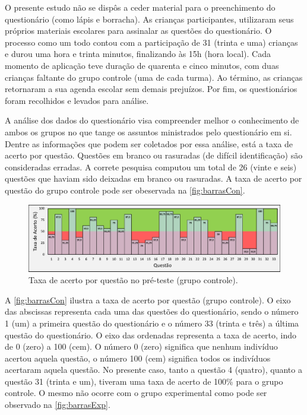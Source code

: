 O presente estudo não se dispôs a ceder material para o preenchimento do questionário (como lápis e borracha). As crianças participantes, utilizaram seus próprios materiais escolares para assinalar as questões do questionário. O processo como um todo contou com a participação de 31 (trinta e uma)  crianças e durou uma hora e trinta minutos, finalizando às 15h (hora local). Cada momento de aplicação teve duração de quarenta e cinco minutos, com duas crianças faltante do grupo controle (uma de cada turma). Ao término, as crianças retornaram a sua agenda escolar sem demais prejuízos. Por fim, os questionários foram recolhidos e levados para análise.

A análise dos dados do questionário visa compreender melhor o conhecimento de ambos os grupos no que tange os assuntos ministrados pelo questionário em si. Dentre as informações que podem ser coletados por essa análise, está a taxa de acerto por questão. Questões em branco ou rasuradas (de difícil identificação) são consideradas erradas. A correte pesquisa computou um total de 26 (vinte e seis) questões que haviam sido deixadas em branco ou rasuradas. A taxa de acerto por questão do grupo controle pode ser obeservada na \autoref{fig:barrasCon}.

\begin{figure}[htb]

    \caption{\label{fig:barrasCon}Taxa de acerto por questão no pré-teste (grupo controle).}
    \includegraphics[width=\linewidth]{./Visuais/Notas4.pdf}
  
\end{figure}

A \autoref{fig:barrasCon} ilustra a taxa de acerto por questão (grupo controle). O eixo das abscissas representa cada uma das questões do questionário, sendo o número 1 (um) a primeira questão do questionário e o número 33 (trinta e três) a última questão do questionário. O eixo das ordenadas representa a taxa de acerto, indo de 0 (zero) a 100 (cem). O número 0 (zero) significa que nenhum indivíduo acertou aquela questão, o número 100 (cem) significa todos os indivíduos acertaram aquela questão. No presente caso, tanto a questão 4 (quatro), quanto a questão 31 (trinta e um), tiveram uma taxa de acerto de 100\% para o grupo controle. O mesmo não ocorre com o grupo experimental como pode ser observado na \autoref{fig:barrasExp}.

